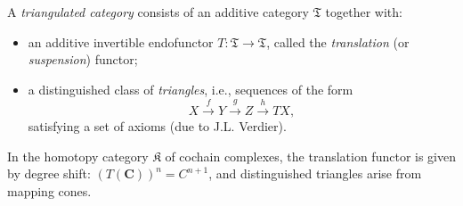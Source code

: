 A {\it triangulated category} consists of an additive category $\mathfrak{T}$ together with:
\begin{itemize}
\item an additive invertible endofunctor $T : \mathfrak{T} \to \mathfrak{T}$, called the {\it translation} (or {\it suspension}) functor;
\item a distinguished class of {\it triangles}, i.e., sequences of the form
\[
X \xrightarrow{f} Y \xrightarrow{g} Z \xrightarrow{h} T X,
\]
satisfying a set of axioms (due to J.L. Verdier).
\end{itemize}
In the homotopy category $\mathfrak{K}$ of cochain complexes, the translation functor is given by degree shift: $(T(\mathbf{C}))^n = C^{n+1}$, and distinguished triangles arise from mapping cones.
